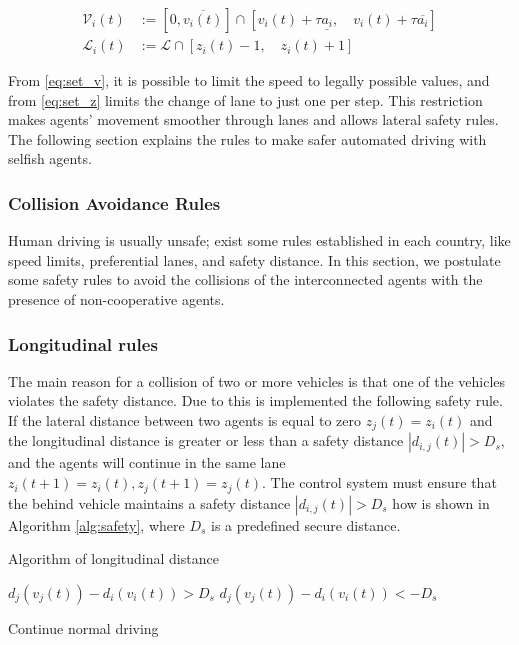 \begin{align}
    \mathcal{V}_i(t) & :=\left[ 0,\overline{v_i(t)} \right] \cap \left[ v_i(t)+ \tau  \underline{a_i},\quad v_i(t)+ \tau  \overline{a_i} \right]
    \label{eq:set_v}
\\
    \mathcal{L}_i(t) & :=\mathcal{L} \cap \left[ z_i(t) -1, \quad z_i(t)+1 \right]
    \label{eq:set_z}
\end{align}

From \ref{eq:set_v}, it is possible to limit the speed to legally possible values, and from \ref{eq:set_z} limits the change of lane to just one per step. This restriction makes agents' movement smoother through lanes and allows lateral safety rules. The following section explains the rules to make safer automated driving with selfish agents.

\subsubsection{Collision Avoidance Rules}
 
Human driving is usually unsafe; exist some rules established in each country, like speed limits, preferential lanes, and safety distance. In this section, we postulate some safety rules to avoid the collisions of the interconnected agents with the presence of non-cooperative agents.\\

\subsubsection{Longitudinal rules}
The main reason for a collision of two or more vehicles is that one of the vehicles violates the safety distance. Due to this is implemented the following safety rule. If the lateral distance between two agents is equal to zero $z_j(t)=z_i(t) $ and the longitudinal distance is greater or less than a safety distance $\left| d_{i,j}(t) \right| > D_s$, and the agents will continue in the same lane $z_i(t+1) =  z_i(t), z_j(t+1) =  z_j(t)$. The control system must ensure that the behind vehicle maintains a safety distance $\left| d_{i,j}(t) \right| > D_s$ how is shown in Algorithm \ref{alg:safety}, where $D_s$ is a predefined secure distance.\\

\begin{algorithm}
\caption{Algorithm of longitudinal distance}\label{alg:safety}
\begin{algorithmic}
        \State $d_j(v_j(t)) -d_i(v_i(t)) > D_s$
        \State $d_j(v_j(t)) -d_i(v_i(t)) < -D_s$
    \Else
        
        \State Continue normal driving
    \EndIf
\EndIf

\end{algorithmic}
\end{algorithm}

